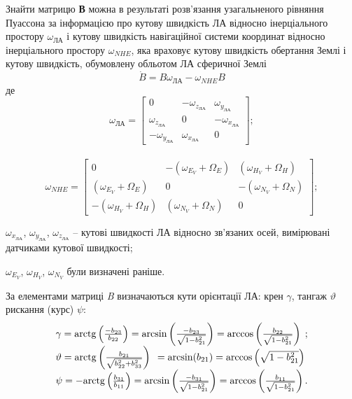 Знайти матрицю \textbf{В} можна в результаті розв'язання 
узагальненого рівняння Пуассона за інформацією про кутову швидкість ЛА відносно інерціального 
простору $\omega_{\text{ЛА}}$ і кутову швидкість навігаційної системи координат відносно 
інерціального простору $\omega_{NHE}$, яка враховує кутову швидкість 
обертання Землі і кутову швидкість, обумовлену обльотом ЛА сферичної Землі 
\[  \dot{B}=B\omega_{\text{ЛА}} -\omega_{NHE}B\] 
де 
\[\omega_{\text{ЛА}} =\left[\begin{array}{ccc} 
{0} & {-\omega_{z_{\text{ЛА}}}} & {\omega_{y_{\text{ЛА}}}} \\ 
{\omega_{z_{\text{ЛА}}}} & {0} & {-\omega_{x_{\text{ЛА}}}} \\ 
{-\omega_{y_{\text{ЛА}}}} & {\omega_{x_{\text{ЛА}}}} & {0} 
\end{array}\right];\]\\
\[\omega_{NHE} =\left[\begin{array}{ccc} 
{0} & {-(\omega_{E_{V}} +\Omega_{E} )} & {(\omega_{H_{V}} +\Omega_{H} )} \\ 
{(\omega_{E_{V}} +\Omega_{E})} & {0} & {-(\omega_{N_{V}} +\Omega_{N} )} \\ 
{-(\omega_{H_{V}} +\Omega_{H})}& {(\omega_{N_{V}} +\Omega_{N} )} & {0} 
\end{array}\right];\] 
\begin{ESKDexplanation}
  \item $\omega_{x_{\text{ЛА}}}$, $\omega_{y_{\text{ЛА}}}$, $\omega_{z_{\text{ЛА}}}$  -- кутові 
  швидкості ЛА відносно зв'язаних осей, вимірювані датчиками кутової швидкості; 
  \item $\omega_{E_{V}}$, $\omega_{H_{V}}$, $\omega_{N_{V}}$ були визначені раніше.
\end{ESKDexplanation}
За елементами матриці  \textit{B} визначаються кути орієнтації ЛА: крен $\gamma$, тангаж 
$\vartheta$ рискання (курс) $\psi $: 
\begin{equation} 
\label{eq:angels} 
\begin{array}{l} 
{\gamma ={\rm arctg}\left(
\frac{-b_{23}}{b_{22}} \right)={\rm arcsin}\left(\frac{-b_{23}}{\sqrt{1-b_{21}^{2} 
}} \right)={\rm arccos}\left(\frac{b_{22}}{\sqrt{1-b_{21}^{2}}} \right)\; ; } \\ 
{\vartheta ={\rm arctg}\left(\frac{b_{21}}{\sqrt{b_{22}^{2} +b_{33}^{2}}} 
\right){\rm \; }={\rm arcsin(}b_{21} {\rm )}={\rm arccos}\left(\sqrt{1-b_{21}^{2} 
} \right)} \\ 
{\psi =-{\rm arctg}\left(\frac{b_{31}}{b_{11}} \right)={
\rm arcsin}\left(\frac{-b_{31}}{\sqrt{1-b_{21}^{2}}} \right)={\rm arccos}\left(
\frac{b_{11}}{\sqrt{1-b_{21}^{2}}} \right).} 
\end{array} 
\end{equation} 
